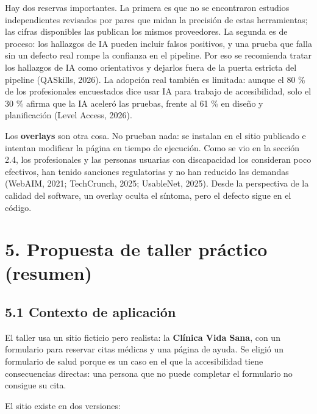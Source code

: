 \documentclass[10pt,letterpaper,onecolumn]{IEEEtran}
\begin{document}
Hay dos reservas importantes. La primera es que no se encontraron estudios independientes revisados por pares que midan la precisión de estas herramientas; las cifras disponibles las publican los mismos proveedores. La segunda es de proceso: los hallazgos de IA pueden incluir falsos positivos, y una prueba que falla sin un defecto real rompe la confianza en el pipeline. Por eso se recomienda tratar los hallazgos de IA como orientativos y dejarlos fuera de la puerta estricta del pipeline (QASkills, 2026). La adopción real también es limitada: aunque el 80 \% de los profesionales encuestados dice usar IA para trabajo de accesibilidad, solo el 30 \% afirma que la IA aceleró las pruebas, frente al 61 \% en diseño y planificación (Level Access, 2026).

Los \textbf{overlays} son otra cosa. No prueban nada: se instalan en el sitio publicado e intentan modificar la página en tiempo de ejecución. Como se vio en la sección 2.4, los profesionales y las personas usuarias con discapacidad los consideran poco efectivos, han tenido sanciones regulatorias y no han reducido las demandas (WebAIM, 2021; TechCrunch, 2025; UsableNet, 2025). Desde la perspectiva de la calidad del software, un overlay oculta el síntoma, pero el defecto sigue en el código.

\section{5. Propuesta de taller práctico (resumen)}\label{propuesta-de-taller-pruxe1ctico-resumen}

\subsection{5.1 Contexto de aplicación}\label{contexto-de-aplicaciuxf3n}

El taller usa un sitio ficticio pero realista: la \textbf{Clínica Vida Sana}, con un formulario para reservar citas médicas y una página de ayuda. Se eligió un formulario de salud porque es un caso en el que la accesibilidad tiene consecuencias directas: una persona que no puede completar el formulario no consigue su cita.

El sitio existe en dos versiones:
\end{document}
